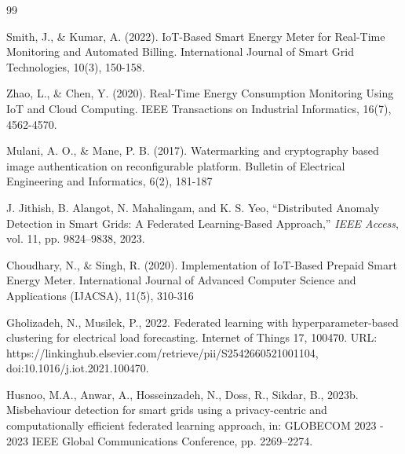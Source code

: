 \renewcommand{\bibname}{REFERENCES} 

\addcontentsline{toc}{chapter}{\bibname}

\begin{thebibliography}{99}

 Smith, J., \& Kumar, A. (2022). IoT-Based Smart Energy Meter for Real-Time Monitoring and Automated Billing. International Journal of Smart Grid Technologies, 10(3), 150-158.

 Zhao, L., \& Chen,  Y. (2020). Real-Time Energy Consumption Monitoring Using IoT and Cloud Computing. IEEE Transactions on Industrial Informatics, 16(7), 4562-4570.

 Mulani,  A.  O.,  \&  Mane,  P.  B.  (2017).  Watermarking  and  cryptography  based  image  authentication  on reconfigurable platform. Bulletin of Electrical Engineering and Informatics, 6(2), 181-187

 J. Jithish, B. Alangot, N. Mahalingam, and K. S. Yeo, ``Distributed Anomaly Detection in Smart Grids: A Federated Learning-Based Approach,'' \textit{IEEE Access}, vol. 11, pp. 9824--9838, 2023.

 Choudhary,  N.,  \&  Singh,  R.  (2020).  Implementation  of  IoT-Based  Prepaid  Smart  Energy  Meter.  International Journal of Advanced Computer Science and Applications (IJACSA), 11(5), 310-316

 Gholizadeh, N., Musilek, P., 2022. Federated learning with hyperparameter-based clustering for electrical load forecasting. Internet of Things 17,
100470. URL: https://linkinghub.elsevier.com/retrieve/pii/S2542660521001104, doi:10.1016/j.iot.2021.100470.

 Husnoo, M.A., Anwar, A., Hosseinzadeh, N., Doss, R., Sikdar, B., 2023b. Misbehaviour detection for smart grids using a privacy-centric and
computationally efficient federated learning approach, in: GLOBECOM 2023 - 2023 IEEE Global Communications Conference, pp. 2269–2274.


\end{thebibliography}